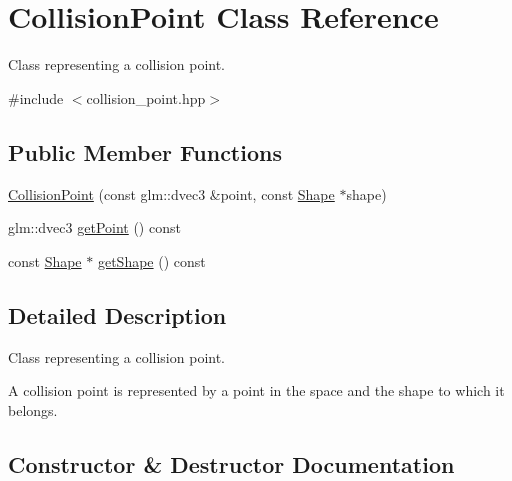 \hypertarget{class_collision_point}{}\section{Collision\+Point Class Reference}
\label{class_collision_point}


Class representing a collision point.  




{\ttfamily \#include $<$collision\+\_\+point.\+hpp$>$}

\subsection*{Public Member Functions}
\begin{DoxyCompactItemize}
\item 
\hyperlink{class_collision_point_ab5b42d7e054ed2d3bad382a30d7ac163}{Collision\+Point} (const glm\+::dvec3 \&point, const \hyperlink{class_shape}{Shape} $\ast$shape)
\item 
glm\+::dvec3 \hyperlink{class_collision_point_a81bc9e6bbde55ac5e39dc1454dc7cd5f}{get\+Point} () const 
\item 
const \hyperlink{class_shape}{Shape} $\ast$ \hyperlink{class_collision_point_a1b3a964945343a1f9d6ed69ee00f9497}{get\+Shape} () const 
\end{DoxyCompactItemize}


\subsection{Detailed Description}
Class representing a collision point. 

A collision point is represented by a point in the space and the shape to which it belongs. 

\subsection{Constructor \& Destructor Documentation}
